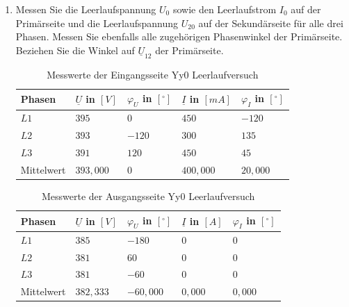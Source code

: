 \begin{enumerate}[label=\alph*)]
  \item Messen Sie die Leerlaufspannung $U_0$ sowie den Leerlaufstrom $I_0$ auf der
        Primärseite und die Leerlaufspannung $U_{20}$ auf der Sekundärseite für alle
        drei Phasen. Messen Sie ebenfalls alle zugehörigen Phasenwinkel der
        Primärseite. Beziehen Sie die Winkel auf $\underline U_{12}$ der Primärseite.

        \begin{table}[h!]
          \caption{Messwerte der Eingangsseite Yy0 Leerlaufversuch}
          \centering
          \begin{tabular}{lllll}
            \\ \hline
            Phasen     & $\underline{U}$ in $[V]$ & $\varphi_{U}$ in $[^\circ]$ & $\underline{I}$ in $[mA]$ & $\varphi_{I}$ in $[^\circ]$ \\ \hline
            $L1$       & $395$                    & $0$                         & $450$                     & $-120$                      \\
            $L2$       & $393$                    & $-120$                      & $300$                     & $135$                       \\
            $L3$       & $391$                    & $120$                       & $450$                     & $45$                        \\ \hline
            Mittelwert & $393,000$                & $0$                         & $400,000$                 & $20,000$                    \\ \hline\hline
          \end{tabular}
        \end{table}
        \begin{table}[h!]
          \centering
          \caption{Messwerte der Ausgangsseite Yy0 Leerlaufversuch}
          \begin{tabular}{lllll}
            \\ \hline
            Phasen     & $\underline{U}$ in $[V]$ & $\varphi_{U}$ in $[^\circ]$ & $\underline{I}$ in $[A]$ & $\varphi_{I}$ in $[^\circ]$ \\ \hline
            $L1$       & $385$                    & $-180$                      & $0$                      & $0$                         \\
            $L2$       & $381$                    & $60$                        & $0$                      & $0$                         \\
            $L3$       & $381$                    & $-60$                       & $0$                      & $0$                         \\ \hline
            Mittelwert & $382,333$                & $-60,000$                   & $0,000$                  & $0,000$                     \\ \hline\hline
          \end{tabular}
        \end{table}
\end{enumerate}
